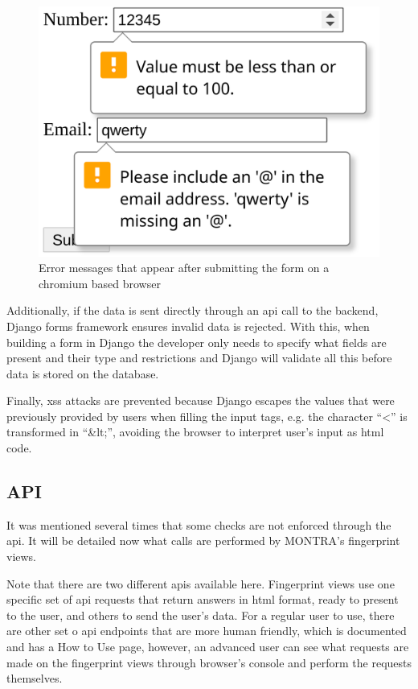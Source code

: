 \begin{figure}[h]
    \center
    \includegraphics[width=.3\textwidth]{html-form-validation}
    \caption{Error messages that appear after submitting the form on a chromium based browser}
    \label{fig:html-form-validation}
\end{figure}

Additionally, if the data is sent directly through an \gls{api} call to the backend, Django forms framework ensures invalid data is rejected.
With this, when building a form in Django the developer only needs to specify what fields are present and their type and restrictions and Django will validate all this before data is stored on the database.

Finally, \gls{xss} attacks are prevented because Django escapes the values that were previously provided by users when filling the input tags, e.g. the character ``<'' is transformed in ``\&lt;'', avoiding the browser to interpret user's input as \gls{html} code.

\subsection*{API}


It was mentioned several times that some checks are not enforced through the \gls{api}.
It will be detailed now what calls are performed by MONTRA's fingerprint views.

Note that there are two different \gls{api}s available here.
Fingerprint views use one specific set of \gls{api} requests that return answers in \gls{html} format, ready to present to the user, and others to send the user's data.
For a regular user to use, there are other set o \gls{api} endpoints that are more human friendly, which is documented and has a How to Use page, however, an advanced user can see what requests are made on the fingerprint views through browser's console and perform the requests themselves.

